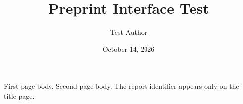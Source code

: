 \documentclass{article}
\title{Preprint Interface Test}
\author{Test Author}
\date{October 14, 2026}
\begin{document}
\maketitle
First-page body.
\newpage
Second-page body. The report identifier appears only on the title page.
\end{document}
